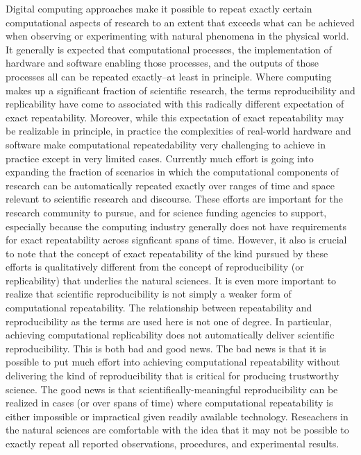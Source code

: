 Digital computing approaches make it possible to repeat exactly certain computational aspects of research
	to an extent that exceeds what can be achieved when observing or experimenting with natural 
	phenomena in the physical world.  
It generally is expected that computational processes, the implementation of hardware and software 
	enabling those processes, and the outputs of those processes all can be repeated exactly--at least in principle.
Where computing makes up a significant fraction of scientific research, the terms reproducibility and
	replicability have come to associated with this radically different expectation of exact repeatability. 
Moreover, while this expectation of exact repeatability may be realizable in principle, in practice the complexities of real-world
	hardware and software make  computational repeatedability very challenging to achieve in practice except in very limited cases.
Currently much effort is going into expanding the fraction of scenarios in which the computational
	components of research can be automatically repeated exactly over ranges of time and space relevant to scientific 
	research and discourse.
These efforts are important for the research community to pursue, and for science funding
	agencies to support, especially because the computing industry generally does not have 
	requirements for exact repeatability across signficant spans of time.
However, it also is crucial to note that the concept of exact repeatability of the kind pursued by these efforts is 
	qualitatively different from the concept of reproducibility (or replicability) that underlies the natural sciences.
It is even more important to realize that scientific reproducibility is not simply a weaker form of computational
	repeatability.  
The relationship between repeatability and reproducibility as the terms are used here is not one of degree.
In particular, achieving computational replicability does not automatically deliver scientific reproducibility.
This is both bad and good news.
The bad news is that it is possible to put much effort into achieving computational repeatability without delivering
	the kind of reproducibility that is critical for producing trustworthy science.
The good news is that scientifically-meaningful reproducibility can be realized in cases (or over spans of time)
	where computational repeatability is either impossible or impractical given readily available technology.
Reseachers in the natural sciences are comfortable with the idea that it may not be possible to exactly
	repeat all reported observations, procedures, and experimental results.

